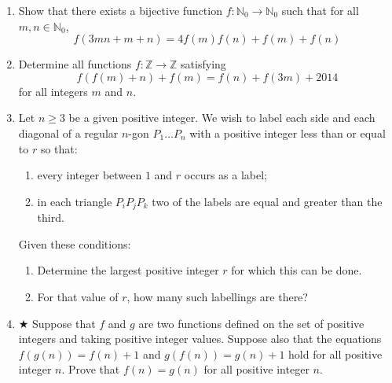 \begin{enumerate}
    


    \item Show that there exists a bijective function $f:\mathbb N_0\to\mathbb N_0$ such that for all $m,n\in\mathbb{N}_{0}$, $$f(3mn + m + n) = 4f(m)f(n) + f(m) + f(n)$$

    


    \item Determine all functions $f: \mathbb Z \to \mathbb Z$ satisfying $$f(f(m) + n) + f(m) = f(n) + f(3m) + 2014$$ for all integers $m$ and $n$.

    


    \item Let $n \ge 3$ be a given positive integer. We wish to label each side and each diagonal of a regular $n$-gon $P_1 \ldots P_n$ with a positive integer less than or equal to $r$ so that:

\begin{enumerate}

	    


        \item every integer between $1$ and $r$ occurs as a label;
        


        \item in each triangle $P_iP_jP_k$ two of the labels are equal and greater than the third.

\end{enumerate}
    
    Given these conditions:

\begin{enumerate}

        


        \item Determine the largest positive integer $r$ for which this can be done.
        


        \item For that value of $r$, how many such labellings are there?

\end{enumerate}

    


    \item $ \bigstar $ Suppose that $f$ and $g$ are two functions defined on the set of positive integers and taking positive integer values. Suppose also that the equations $f(g(n)) = f(n) + 1$ and $g(f(n)) = g(n) + 1$ hold for all positive integer $n$. Prove that $f(n) = g(n)$ for all positive integer $n$.


\end{enumerate}
